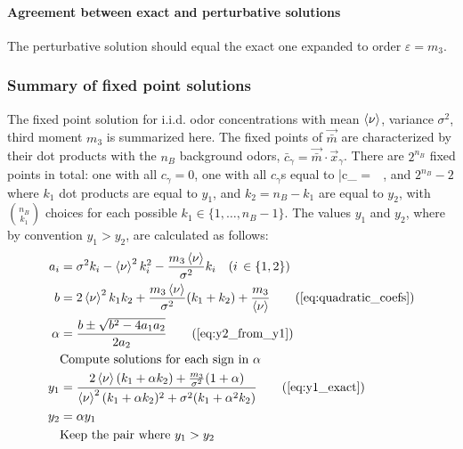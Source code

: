 \paragraph{Agreement between exact and perturbative solutions}
The perturbative solution should equal the exact one expanded to order $\varepsilon = m_3$. 


\subsubsection{Summary of fixed point solutions}
\label{subsec:summary_fixed_points}
The fixed point solution for i.i.d. odor concentrations with mean $\braket{\nu}$, variance $\sigma^2$, third moment $m_3$ is summarized here. The fixed points of $\vec{\bar{m}}$ are characterized by their dot products with the $n_B$ background odors, $\bar{c}_{\gamma} = \vec{\bar{m}} \cdot \vec{x}_{\gamma}$. There are $2^{n_B}$ fixed points in total: one with all $c_{\gamma} = 0$, one with all $c_{\gamma}$s equal to
\beq
\bar{c}_{\gamma} =  \,\, ,
\tag{\ref{eq:all_cg_equal_solution}}
\eeq
and $2^{n_B} - 2$ where $k_1$ dot products are equal to $y_1$, and $k_2 = n_B - k_1$ are equal to $y_2$, with $\binom{n_B}{k_1}$ choices for each possible $k_1 \in \{1, \ldots, n_B-1\}$. The values $y_1$ and $y_2$, where by convention $y_1 > y_2$, are calculated as follows:
\begin{align}
    a_i &= \sigma^2 k_i - \avgnu^2 k_i^2 - \frac{m_3 \avgnu}{\sigma^2} k_i  \quad (i \, \in \{1, 2\})  \nonumber \\
    b &= 2 \avgnu^2 k_1 k_2  + \frac{m_3 \avgnu}{\sigma^2}(k_1 + k_2) + \frac{m_3}{\avgnu} 	\tag{\ref{eq:quadratic_coefs}}  \\
    \alpha &= \frac{b \pm \sqrt{b^2 - 4a_1a_2}}{2a_2}    	\tag{\ref{eq:y2_from_y1}} \\
    &\text{Compute solutions for each sign in } \alpha 	\nonumber \\
    y_1 &= \frac{2 \avgnu(k_1 + \alpha k_2) + \frac{m_3}{\sigma^2}(1 + \alpha)}{\avgnu^2(k_1 + \alpha k_2)^2 + \sigma^2(k_1 + \alpha^2k_2)}	 \tag{\ref{eq:y1_exact}} \\
    y_2 &= \alpha y_1		\nonumber \\
    &\text{Keep the pair where } y_1 > y_2 \nonumber
\end{align}


